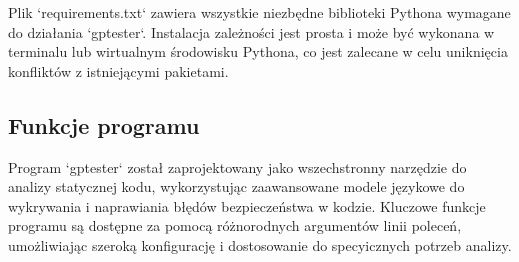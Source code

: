 Plik `requirements.txt` zawiera wszystkie niezbędne biblioteki Pythona wymagane do działania `gptester`. Instalacja zależności jest prosta i może być wykonana w terminalu lub wirtualnym środowisku Pythona, co jest zalecane w celu uniknięcia konfliktów z istniejącymi pakietami.



\subsection{Funkcje programu}
\label{sec:funkcje_programu}

Program `gptester` został zaprojektowany jako wszechstronny narzędzie do analizy statycznej kodu, wykorzystując zaawansowane modele językowe do wykrywania i naprawiania błędów bezpieczeństwa w kodzie. Kluczowe funkcje programu są dostępne za pomocą różnorodnych argumentów linii poleceń, umożliwiając szeroką konfigurację i dostosowanie do specyicznych potrzeb analizy.

